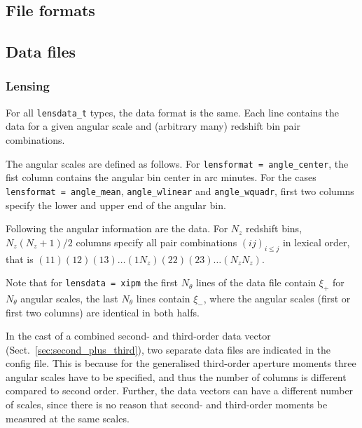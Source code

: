 \documentclass[11pt, chapterprefix, headsepline]{scrartcl}
\begin{document}
\begin{appendix}

\section{File formats}

\subsection{Data files}

\subsubsection{Lensing}
\label{sec:data_lens}

For all \texttt{lensdata\_t} types, the data format is the same. Each
line contains the data for a given angular scale and (arbitrary many)
redshift bin pair combinations.

The angular scales are defined as
follows. For \texttt{lensformat = angle\_center}, the fist column
contains the angular bin center in arc minutes. For the cases \texttt{lensformat
  = angle\_mean}, \texttt{angle\_wlinear} and \texttt{angle\_wquadr},  first
two columns specify the lower and upper end of the angular bin.

Following the angular information are the data. For $N_z$ redshift bins,
$N_z(N_z+1)/2$ columns specify all pair combinations $(ij)_{i\le j}$ in
lexical order, that is $(11)(12)(13) \ldots (1N_z)(22)(23) \ldots (N_z
N_z)$.

Note that for \texttt{lensdata = xipm} the first $N_\theta$ lines of
the data file contain $\xi_+$ for $N_\theta$ angular scales, the last
$N_\theta$ lines contain $\xi_-$, where the angular scales (first or
first two columns) are identical in both halfs. 


In the cast of a combined second- and third-order data vector
(Sect.~\ref{sec:second_plus_third}), two separate data files are indicated in
the config file. This is because for the generalised third-order aperture
moments three angular scales have to be specified, and thus the number of
columns is different compared to second order. Further, the data vectors can
have a different number of scales, since there is no reason that second- and
third-order moments be measured at the same scales.


\end{appendix}
\end{document}
